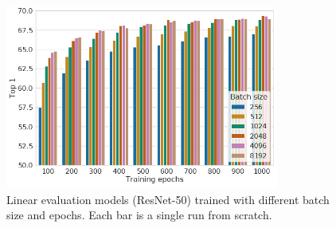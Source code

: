 \documentclass[]{IEEEtran}
\begin{document}
\begin{appendices}
\begin{figure}
    \centering
    \includegraphics[width=9cm]{images/fig9.PNG}
    \caption{Linear evaluation models (ResNet-50) trained with different batch size and epochs. Each bar is a single run from scratch.}
    \label{fig9}
\end{figure}


\newpage
\end{appendices}
\end{document}
